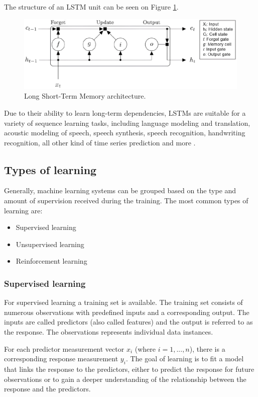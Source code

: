 \documentclass[a4paper,oneside,onecolumn,12pt]{book}
\begin{document}
		The structure of an LSTM unit can be seen on Figure \ref{fig:lstm}.
		\begin{figure}[H]
		\begin{center}
			\includegraphics[keepaspectratio,width=14cm]{kep/lstm.jpg}
			\caption{Long Short-Term Memory architecture. \cite{HLSTMW}}
			\label{fig:lstm}
		\end{center}
		\end{figure}
		Due to their ability to learn long-term dependencies, LSTMs are suitable for a variety of sequence learning tasks, including language modeling and translation, acoustic modeling of speech, speech synthesis, speech recognition, handwriting recognition, all other kind of time series prediction and more \cite{LSTM}.

	\subsection{Types of learning}
	Generally, machine learning systems can be grouped based on the type and amount of supervision received during the training. The most common types of learning are:
	\begin{itemize}
		\item Supervised learning
		\item Unsupervised learning
		\item Reinforcement learning
	\end{itemize}
	\cite{HMLSKT}
		
		\subsubsection{Supervised learning}
		For supervised learning a training set is available. The training set consists of numerous observations with predefined inputs and a corresponding output. The inputs are called predictors (also called features) and the output is referred to as the response. The observations represents individual data instances. \cite{TESL}

		For each predictor measurement vector $x_i$ (where $i = 1, ..., n$), there is a corresponding response measurement $y_i$. The goal of learning is to fit a model that links the response to the predictors, either to predict the response for future observations or to gain a deeper understanding of the relationship between the response and the predictors. \cite{AISL}
\end{document}

